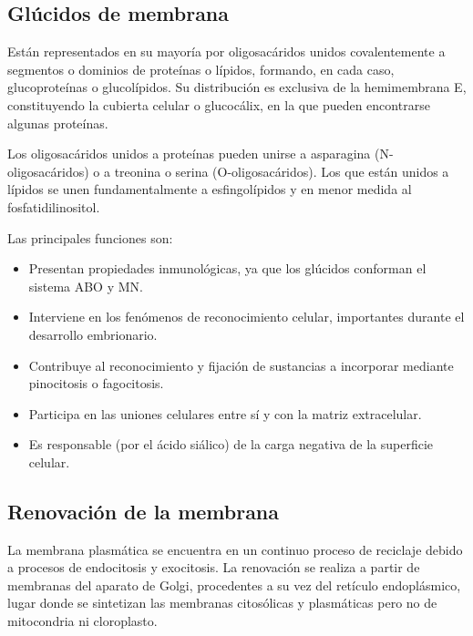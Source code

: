 \subsection{Glúcidos de membrana}
Están representados en su mayoría por oligosacáridos unidos covalentemente a segmentos o dominios de proteínas o lípidos, formando, en cada caso, glucoproteínas o glucolípidos. Su distribución es exclusiva de la hemimembrana E, constituyendo la cubierta celular o glucocálix, en la que pueden encontrarse algunas proteínas.

Los oligosacáridos unidos a proteínas pueden unirse a asparagina (N-oligosacáridos) o a treonina o serina (O-oligosacáridos). Los que están unidos a lípidos se unen fundamentalmente a esfingolípidos y en menor medida al fosfatidilinositol.

Las principales funciones son:
\begin{itemize}[itemsep=0pt,parsep=0pt,topsep=0pt,partopsep=0pt]
    \item Presentan propiedades inmunológicas, ya que los glúcidos conforman el sistema ABO y MN.
    \item Interviene en los fenómenos de reconocimiento celular, importantes durante el desarrollo embrionario.
    \item Contribuye al reconocimiento y fijación de sustancias a incorporar mediante pinocitosis o fagocitosis.
    \item Participa en las uniones celulares entre sí y con la matriz extracelular.
    \item Es responsable (por el ácido siálico) de la carga negativa de la superficie celular.
\end{itemize}
\subsection{Renovación de la membrana}
La membrana plasmática se encuentra en un continuo proceso de reciclaje debido a procesos de endocitosis y exocitosis. La renovación se realiza a partir de membranas del aparato de Golgi, procedentes a su vez del retículo endoplásmico, lugar donde se sintetizan las membranas citosólicas y plasmáticas pero no de mitocondria ni cloroplasto. 
